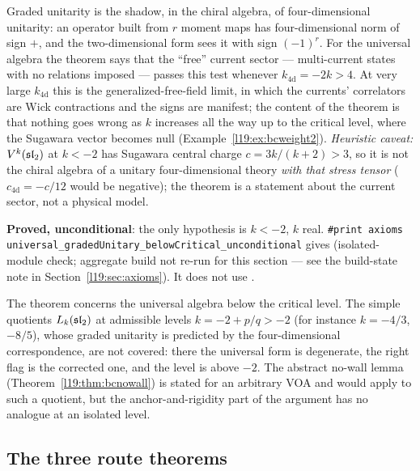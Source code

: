 \begin{physics}
Graded unitarity is the shadow, in the chiral algebra, of four-dimensional unitarity: an operator built from $r$
moment maps has four-dimensional norm of sign $+$, and the two-dimensional form sees it with sign $(-1)^r$. For the
universal algebra the theorem says that the ``free'' current sector --- multi-current states with no relations
imposed --- passes this test whenever $k_{\mathrm{4d}} = -2k>4$. At very large $k_{\mathrm{4d}}$ this is the
generalized-free-field limit, in which the currents' correlators are Wick contractions and the signs are manifest;
the content of the theorem is that nothing goes wrong as $k$ increases all the way up to the critical level, where the Sugawara
vector becomes null (Example~\ref{l19:ex:bcweight2}). \emph{Heuristic caveat:} $V^k(\mathfrak{sl}_2)$ at $k<-2$ has
Sugawara central charge $c = 3k/(k+2)>3$, so it is not the chiral algebra of a unitary four-dimensional theory
\emph{with that stress tensor} ($c_{\mathrm{4d}} = -c/12$ would be negative); the theorem is a statement about the
current sector, not a physical model.
\end{physics}

\begin{status}
\textbf{Proved, unconditional}: the only hypothesis is $k<-2$, $k$ real. \texttt{\#print axioms
universal\_gradedUnitary\_belowCritical\_unconditional} gives 
(isolated-module check; aggregate build not re-run for this section --- see the build-state note in
Section~\ref{l19:sec:axioms}). It does not use .
\end{status}

\begin{remark}[Scope]\label{l19:rem:bcscope}
The theorem concerns the universal algebra below the critical level. The simple quotients
$L_k(\mathfrak{sl}_2)$ at admissible levels $k = -2+p/q>-2$ (for instance $k = -4/3$, $-8/5$), whose graded unitarity is
predicted by the four-dimensional correspondence, are not covered:
there the universal form is degenerate, the right flag is the corrected one, and the level is above $-2$. The
abstract no-wall lemma (Theorem~\ref{l19:thm:bcnowall}) is stated for an arbitrary VOA and would apply to such a
quotient, but the anchor-and-rigidity part of the argument has no analogue at an isolated level.
\end{remark}

\subsection{The three route theorems}


